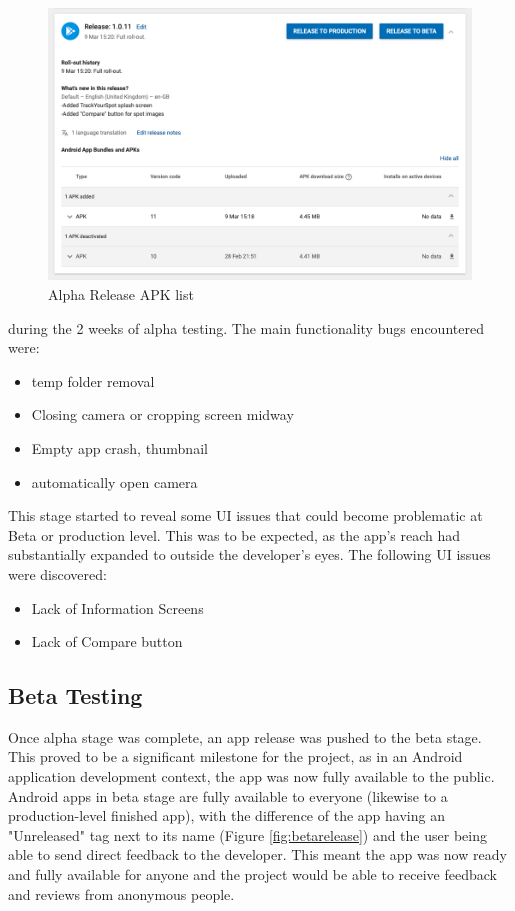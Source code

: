 \begin{figure}
    \includegraphics[width=1.2\textwidth, center]{figures/alpha_releases.png}
    \caption{Alpha Release APK list}
    \label{fig:alpha_releases.png}
\end{figure}
during the 2 weeks of alpha testing. The main functionality bugs encountered were: 
\begin{itemize}
    \item temp folder removal
    \item Closing camera or cropping screen midway
    \item Empty app crash, thumbnail 
    \item automatically open camera
\end{itemize}
\par This stage started to reveal some UI issues that could become problematic at Beta or production level. This was to be expected, as the app's reach had substantially expanded to outside the developer's eyes. The following UI issues were discovered: 
\begin{itemize}
    \item Lack of Information Screens
    \item Lack of Compare button
\end{itemize}

\subsection{Beta Testing}
Once alpha stage was complete, an app release was pushed to the beta stage. This proved to be a significant milestone for the project, as in an Android application development context, the app was now fully available to the public. Android apps in beta stage are fully available to everyone (likewise to a production-level finished app), with the difference of the app having an "Unreleased" tag next to its name (Figure \ref{fig:betarelease}) and the user being able to send direct feedback to the developer. This meant the app was now ready and fully available for anyone and the project would be able to receive feedback and reviews from anonymous people. 

